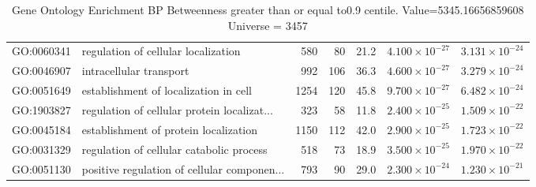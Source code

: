 \begin{table}[ht]
\begin{adjustbox}{width=\textwidth}
\begin{tabular}{llrrrrr}
  GO:0060341 & regulation of cellular localization & 580 & 80 & 21.2 & $4.100 \times 10^{-27}$ & $3.131 \times 10^{-24}$ \\ 
  GO:0046907 & intracellular transport & 992 & 106 & 36.3 & $4.600 \times 10^{-27}$ & $3.279 \times 10^{-24}$ \\ 
  GO:0051649 & establishment of localization in cell & 1254 & 120 & 45.8 & $9.700 \times 10^{-27}$ & $6.482 \times 10^{-24}$ \\ 
  GO:1903827 & regulation of cellular protein localizat... & 323 & 58 & 11.8 & $2.400 \times 10^{-25}$ & $1.509 \times 10^{-22}$ \\ 
  GO:0045184 & establishment of protein localization & 1150 & 112 & 42.0 & $2.900 \times 10^{-25}$ & $1.723 \times 10^{-22}$ \\ 
  GO:0031329 & regulation of cellular catabolic process & 518 & 73 & 18.9 & $3.500 \times 10^{-25}$ & $1.970 \times 10^{-22}$ \\ 
  GO:0051130 & positive regulation of cellular componen... & 793 & 90 & 29.0 & $2.300 \times 10^{-24}$ & $1.230 \times 10^{-21}$ \\ 
   \hline
\end{tabular}
\end{adjustbox}
\caption{Gene Ontology Enrichment BP Betweenness  greater than or equal to0.9 centile.   Value=5345.16656859608 Universe = 3457} 
\label{tab:Gene Ontology Enrichment BP Betweenness  greater than or equal to0.9 centile.   Value=5345.16656859608 Universe = 3457}
\end{table}


